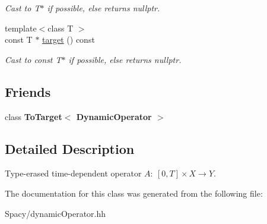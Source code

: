 \begin{DoxyCompactItemize}
\begin{DoxyCompactList}\small\item\em Cast to T$\ast$ if possible, else returns nullptr. \end{DoxyCompactList}\item 
\hypertarget{structSpacy_1_1Mixin_1_1ToTarget_a98985b22f6fc98d253c8416c54a5e359}{}{\footnotesize template$<$class T $>$ }\\const T $\ast$ \hyperlink{structSpacy_1_1Mixin_1_1ToTarget_a98985b22f6fc98d253c8416c54a5e359}{target} () const \label{structSpacy_1_1Mixin_1_1ToTarget_a98985b22f6fc98d253c8416c54a5e359}

\begin{DoxyCompactList}\small\item\em Cast to const T$\ast$ if possible, else returns nullptr. \end{DoxyCompactList}\end{DoxyCompactItemize}
\subsection*{Friends}
\begin{DoxyCompactItemize}
\item 
\hypertarget{classSpacy_1_1DynamicOperator_a42bda39951244b65734480b6c94824ea}{}class {\bfseries To\+Target$<$ Dynamic\+Operator $>$}\label{classSpacy_1_1DynamicOperator_a42bda39951244b65734480b6c94824ea}

\end{DoxyCompactItemize}


\subsection{Detailed Description}
Type-\/erased time-\/dependent operator $A:\ [0,T] \times X \to Y $. 

The documentation for this class was generated from the following file\+:\begin{DoxyCompactItemize}
\item 
Spacy/dynamic\+Operator.\+hh\end{DoxyCompactItemize}
